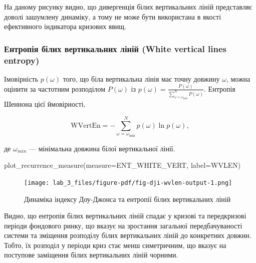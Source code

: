 \documentclass[
  letterpaper,
]{report}
\newenvironment{Shaded}{\begin{snugshade}}{\end{snugshade}}
\newcommand{\NormalTok}[1]{\textcolor[rgb]{0.00,0.23,0.31}{#1}}
\newcommand{\OperatorTok}[1]{\textcolor[rgb]{0.37,0.37,0.37}{#1}}
\newcommand{\StringTok}[1]{\textcolor[rgb]{0.13,0.47,0.30}{#1}}
\begin{document}
На даному рисунку видно, що дивергенція білих вертикальних ліній
представляє доволі зашумлену динаміку, а тому не може бути використана в
якості ефективного індикатора кризових явищ.

\hypertarget{ux435ux43dux442ux440ux43eux43fux456ux44f-ux431ux456ux43bux438ux445-ux432ux435ux440ux442ux438ux43aux430ux43bux44cux43dux438ux445-ux43bux456ux43dux456ux439-white-vertical-lines-entropy}{%
\subsubsection{Ентропія білих вертикальних ліній (White vertical lines
entropy)}\label{ux435ux43dux442ux440ux43eux43fux456ux44f-ux431ux456ux43bux438ux445-ux432ux435ux440ux442ux438ux43aux430ux43bux44cux43dux438ux445-ux43bux456ux43dux456ux439-white-vertical-lines-entropy}}

Імовірність \(p( \omega )\) того, що біла вертикальна лінія має точну
довжину \(\omega\), можна оцінити за частотним розподілом \(P(\omega )\)
із
\(p( \omega )={\frac {P( \omega )}{\sum _{{\omega = \omega_{\min }}}^{N}P(\omega )}}\).
Ентропія Шеннона цієї ймовірності,

\[
{\text{WVertEn}}=-\sum_{{\omega =\omega _{\min }}}^{N}p(\omega )\ln p(\omega ),
\]

де \(\omega_{min}\) --- мінімальна довжина білої вертикальної лінії.

\begin{Shaded}
\begin{Highlighting}[]
\NormalTok{plot\_recurrence\_measure(measure}\OperatorTok{=}\NormalTok{ENT\_WHITE\_VERT, label}\OperatorTok{=}\StringTok{\textquotesingle{}WVLEN\textquotesingle{}}\NormalTok{)}
\end{Highlighting}
\end{Shaded}

\begin{figure}[H]

{\centering \texttt{[image: lab\_3\_files/figure-pdf/fig-dji-wvlen-output-1.png]}

}

\caption{\label{fig-dji-wvlen}Динаміка індексу Доу-Джонса та ентропії
білих вертикальних ліній}

\end{figure}

Видно, що ентропія білих вертикальних ліній спадає у кризові та
передкризові періоди фондового ринку, що вказує на зростання загальної
передбачуваності системи та зміщення розподілу білих вертикальних ліній
до конкретних довжин. Тобто, їх розподіл у періоди криз стає менш
симетричним, що вказує на поступове заміщення білих вертикальних ліній
чорними.
\end{document}
